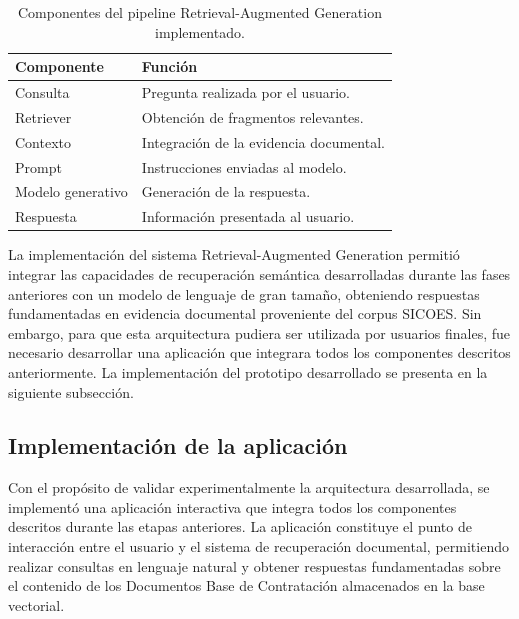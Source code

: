 \begin{table}[H]
\centering
\caption{Componentes del pipeline Retrieval-Augmented Generation implementado.}
\label{tab:rag_pipeline}

\begin{tabular}{p{4cm}p{9cm}}
\hline
\textbf{Componente} & \textbf{Función}\\
\hline

Consulta &
Pregunta realizada por el usuario.\\

Retriever &
Obtención de fragmentos relevantes.\\

Contexto &
Integración de la evidencia documental.\\

Prompt &
Instrucciones enviadas al modelo.\\

Modelo generativo &
Generación de la respuesta.\\

Respuesta &
Información presentada al usuario.\\

\hline
\end{tabular}

\end{table}

La implementación del sistema Retrieval-Augmented Generation permitió integrar las capacidades de recuperación semántica desarrolladas durante las fases anteriores con un modelo de lenguaje de gran tamaño, obteniendo respuestas fundamentadas en evidencia documental proveniente del corpus SICOES. Sin embargo, para que esta arquitectura pudiera ser utilizada por usuarios finales, fue necesario desarrollar una aplicación que integrara todos los componentes descritos anteriormente. La implementación del prototipo desarrollado se presenta en la siguiente subsección.

\subsection{Implementación de la aplicación}

Con el propósito de validar experimentalmente la arquitectura desarrollada, se implementó una aplicación interactiva que integra todos los componentes descritos durante las etapas anteriores. La aplicación constituye el punto de interacción entre el usuario y el sistema de recuperación documental, permitiendo realizar consultas en lenguaje natural y obtener respuestas fundamentadas sobre el contenido de los Documentos Base de Contratación almacenados en la base vectorial.

